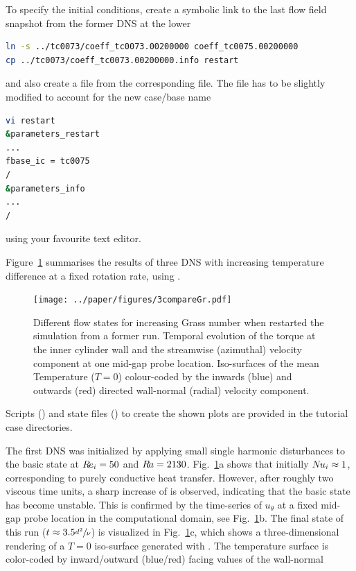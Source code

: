 \documentclass[a4paper, 11pt, DIV=11]{scrartcl}
\begin{document}
To specify the initial conditions, create a symbolic link to the last flow field snapshot
from the former DNS at the lower \Gr
\begin{lstlisting}[language=bash]
ln -s ../tc0073/coeff_tc0073.00200000 coeff_tc0075.00200000
cp ../tc0073/coeff_tc0073.00200000.info restart
\end{lstlisting}
and also create a file  from the corresponding  file.
The file  has to be slightly modified to account for the new case/base
name
\begin{lstlisting}[language=bash]
vi restart
&parameters_restart
...
fbase_ic = tc0075
/
&parameters_info
...
/
\end{lstlisting}
using your favourite text editor.
\par
Figure~\ref{fig:compareGrass} summarises the results of three DNS with increasing 
temperature difference at a fixed rotation rate, using \nsc.
\begin{figure}[htb]
\centering
\texttt{[image: ../paper/figures/3compareGr.pdf]}
\caption{Different flow states for increasing Grass number when restarted
the simulation from a former run. Temporal evolution of the torque at the inner
cylinder wall and the streamwise (azimuthal) velocity component at one mid-gap
probe location. Iso-surfaces of the mean Temperature ($T=0$) colour-coded by the
inwards (blue) and outwards (red) directed wall-normal (radial) velocity component.}
\label{fig:compareGrass}
\end{figure}
Scripts (\gnuplot) and state files (\paraview) to create the shown plots
are provided in the tutorial case directories.
\par
The first DNS was initialized by applying small single harmonic disturbances to 
the basic state at $R\hspace{-0.1em}e_{i}=\num{50}$ and $R\hspace{-0.1em}a=\num{2130}$. 
Fig.~\ref{fig:compareGrass}a shows that initially $N\hspace{-0.1em}u_{i}\approx\num{1}$, 
corresponding to purely conductive heat transfer. However, after roughly two 
viscous time units, a sharp increase of \Nui is observed, indicating that the 
basic state has become unstable. This is confirmed by the time-series of 
$u_{\theta}$ at a fixed mid-gap probe location in the computational domain, see 
Fig.~\ref{fig:compareGrass}b. The final state of this run 
($t\approx\num{3.5}\sfrac{d^2}{\nu}$) is visualized in 
Fig.~\ref{fig:compareGrass}c, which shows a three-dimensional rendering of a 
$T=0$ iso-surface generated with . The temperature surface is 
color-coded by inward/outward (blue/red) facing values of the wall-normal 
\end{document}
